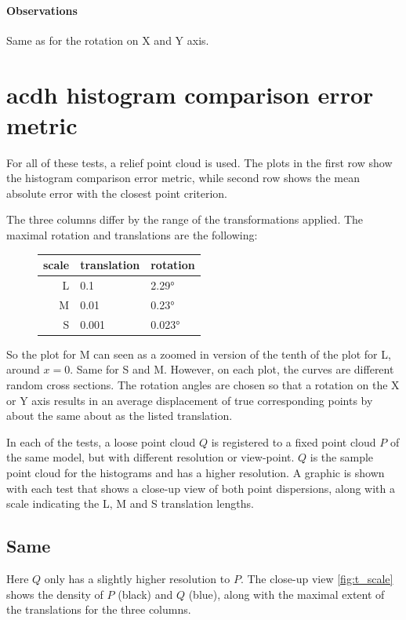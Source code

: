 {\paragraph{Observations} Same as for the rotation on X and Y axis.


\newpage

\section{\Gls{acdh} histogram comparison error metric} \label{sec:chi_err}
For all of these tests, a relief point cloud is used. The plots in the first row show the histogram comparison error metric, while second row shows the mean absolute error with the closest point criterion.

The three columns differ by the range of the transformations applied. The maximal rotation and translations are the following:

\begin{figure}[H]
\centering
\begin{tabularx}{.4\textwidth}{|r|X|X|} \hline
scale  & translation & rotation \\ \hline
L      & 0.1         & 2.29\si{\degree} \\
M      & 0.01        & 0.23\si{\degree} \\
S      & 0.001       & 0.023\si{\degree} \\ \hline
\end{tabularx}
\end{figure}

So the plot for M can seen as a zoomed in version of the tenth of the plot for L, around $x = 0$. Same for S and M. However, on each plot, the curves are different random cross sections. The rotation angles are chosen so that a rotation on the X or Y axis results in an average displacement of true corresponding points by about the same about as the listed translation.

In each of the tests, a loose point cloud $Q$ is registered to a fixed point cloud $P$ of the same model, but with different resolution or view-point. $Q$ is the sample point cloud for the histograms and has a higher resolution. A graphic is shown with each test that shows a close-up view of both point dispersions, along with a scale indicating the L, M and S translation lengths.





\subsection{Same}
Here $Q$ only has a slightly higher resolution to $P$. The close-up view \ref{fig:t_scale} shows the density of $P$ (black) and $Q$ (blue), along with the maximal extent of the translations for the three columns. 

}

